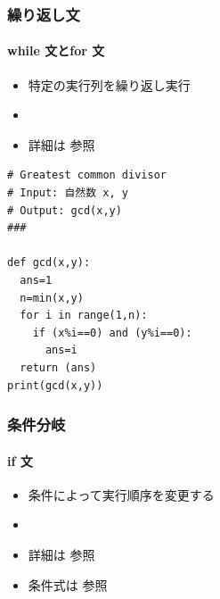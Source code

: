 \begin{frame}[fragile,label=while]
\frametitle{繰り返し文}
\framesubtitle{while 文とfor 文}
  \begin{itemize}
\item 特定の実行列を繰り返し実行
\item \hyperlink{mult}{}
\item 詳細は \href{https://docs.python.org/ja/3/reference/index.html}{}参照
  \end{itemize}
  \begin{lstlisting}[caption={gcd.py(for 文の例)},label=gcd]
# Greatest common divisor
# Input: 自然数 x, y
# Output: gcd(x,y)
###

def gcd(x,y):
  ans=1
  n=min(x,y)
  for i in range(1,n):
    if (x%i==0) and (y%i==0):
      ans=i
  return (ans)
print(gcd(x,y))
  \end{lstlisting}
\end{frame}
\begin{frame}[fragile,label=if]
\frametitle{条件分岐}
\framesubtitle{if 文}
  \begin{itemize}
\item 条件によって実行順序を変更する
\item \hyperlink{gcd}{}
\item 詳細は \href{https://docs.python.org/ja/3/reference/index.html}{}参照
\item 条件式は \href{https://docs.python.org/ja/3/reference/index.html}{}参照
  \end{itemize}
\end{frame}
